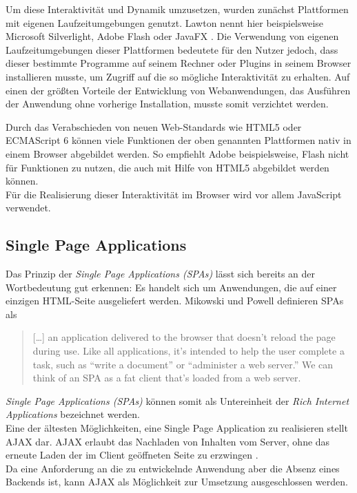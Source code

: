 Um diese Interaktivität und Dynamik umzusetzen, wurden zunächst Plattformen mit eigenen Laufzeitumgebungen genutzt. Lawton nennt hier beispielsweise Microsoft Silverlight, Adobe Flash oder JavaFX  \cite{lawton2008new}.
Die Verwendung von eigenen Laufzeitumgebungen dieser Plattformen  bedeutete für den Nutzer jedoch,  dass dieser bestimmte Programme auf seinem Rechner oder Plugins in seinem Browser installieren musste, um Zugriff auf die so mögliche Interaktivität zu erhalten. Auf einen der größten Vorteile der Entwicklung von Webanwendungen, das Ausführen der Anwendung ohne vorherige Installation, musste somit verzichtet werden.

Durch das Verabschieden von neuen Web-Standards wie HTML5 oder ECMAScript 6 können viele Funktionen der oben genannten Plattformen nativ in einem Browser abgebildet werden. So empfiehlt Adobe beispielsweise, Flash nicht für Funktionen zu nutzen, die auch mit Hilfe von HTML5 abgebildet werden können\footnotemark{}.\\
Für die Realisierung dieser Interaktivität im Browser wird vor allem JavaScript verwendet.


\subsection{Single Page Applications}
Das Prinzip der \textit{Single Page Applications (SPAs)} lässt sich bereits an der Wortbedeutung gut erkennen: Es handelt sich um Anwendungen, die auf einer einzigen HTML-Seite ausgeliefert werden.
Mikowski und Powell definieren SPAs als

\begin{quote}
  […] an application delivered to the browser that doesn’t reload the page during use. Like all applications, it’s intended to help the user complete a task, such as “write a document” or “administer a web server.” We can think of an SPA as a fat client that’s loaded from a web server. \cite{MikowskiPowell201309}
\end{quote}

\textit{Single Page Applications (SPAs)} können somit als Untereinheit der \textit{Rich Internet Applications} bezeichnet werden.\\
Eine der ältesten Möglichkeiten, eine Single Page Application zu realisieren stellt AJAX dar. AJAX erlaubt das Nachladen von Inhalten vom Server, ohne das erneute Laden der im Client geöffneten Seite zu erzwingen \cite{paulson2005building}.\\
Da eine Anforderung an die zu entwickelnde Anwendung aber die Absenz eines Backends ist, kann AJAX als Möglichkeit zur Umsetzung ausgeschlossen werden.

